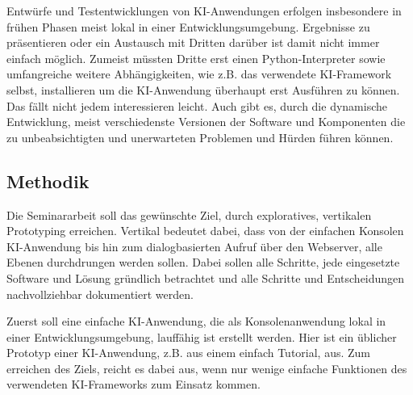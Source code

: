 \documentclass[12pt,oneside,titlepage,listof=totoc,bibliography=totoc]{scrartcl}
\begin{document}
Entwürfe und Testentwicklungen von \ac{KI}-Anwendungen erfolgen insbesondere in frühen Phasen meist lokal in einer Entwicklungsumgebung. Ergebnisse zu präsentieren oder ein Austausch mit Dritten darüber ist damit nicht immer einfach möglich. Zumeist müssten Dritte erst einen Python-Interpreter sowie umfangreiche weitere Abhängigkeiten, wie z.B. das verwendete \ac{KI}-Framework selbst, installieren um die \ac{KI}-Anwendung überhaupt erst Ausführen zu können. Das fällt nicht jedem interessieren leicht. Auch gibt es, durch die dynamische Entwicklung, meist verschiedenste Versionen der Software und Komponenten die zu unbeabsichtigten und unerwarteten Problemen und Hürden führen können.






\subsection{Methodik}

Die Seminararbeit soll das gewünschte Ziel, durch exploratives, vertikalen  Prototyping erreichen. Vertikal bedeutet dabei, dass von der einfachen Konsolen KI-Anwendung bis hin zum dialogbasierten Aufruf über den Webserver, alle Ebenen durchdrungen werden sollen. Dabei sollen alle Schritte, jede eingesetzte Software und Lösung gründlich betrachtet und alle Schritte und Entscheidungen nachvollziehbar dokumentiert werden.

Zuerst soll eine einfache KI-Anwendung, die als Konsolenanwendung lokal in einer Entwicklungsumgebung, lauffähig ist erstellt werden. Hier ist ein üblicher Prototyp einer KI-Anwendung, z.B. aus einem einfach Tutorial, aus. Zum erreichen des Ziels, reicht es dabei aus, wenn nur wenige einfache Funktionen des verwendeten KI-Frameworks zum Einsatz kommen.
\end{document}
